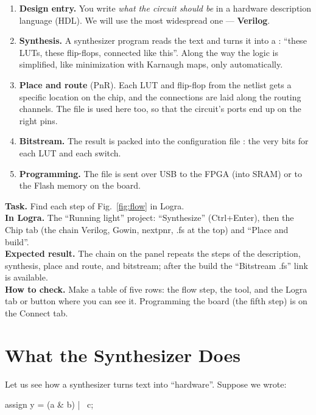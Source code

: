 \begin{enumerate}
  \item \textbf{Design entry.} You write \emph{what the circuit should be} in a
        hardware description language (HDL). We will
        use the most widespread one --- \textbf{Verilog}.
  \item \textbf{Synthesis.} A synthesizer program reads the text and turns it into a
        : ``these LUTs, these flip-flops,
        connected like this''. Along the way the logic is simplified, like minimization
        with Karnaugh maps, only automatically.
  \item \textbf{Place and route} (PnR). Each LUT and
        flip-flop from the netlist gets a specific location on the chip, and the connections
        are laid along the routing channels. The  file is used here
        too, so that the circuit's ports end up on the right pins.
  \item \textbf{Bitstream.} The result is packed into the configuration file
        : the very bits for each LUT and each switch.
  \item \textbf{Programming.} The file is sent over USB to the FPGA (into SRAM) or to the
        Flash memory on the board.
\end{enumerate}

\begin{diybox}
\textbf{Task.} Find each step of Fig.~\ref{fig:flow} in Logra.\\
\textbf{In Logra.} The ``Running light'' project: ``Synthesize'' (Ctrl+Enter), then the Chip tab (the chain Verilog, Gowin, nextpnr, .fs at the top) and ``Place and build''.\\
\textbf{Expected result.} The chain on the panel repeats the steps of the description, synthesis, place and route, and bitstream; after the build the ``Bitstream .fs'' link is available.\\
\textbf{How to check.} Make a table of five rows: the flow step, the tool, and the Logra tab or button where you can see it. Programming the board (the fifth step) is on the Connect tab.
\end{diybox}

\section{What the Synthesizer Does}

Let us see how a synthesizer turns text into ``hardware''. Suppose we wrote:
\begin{vcode}
assign y = (a & b) | ~c;
\end{vcode}

